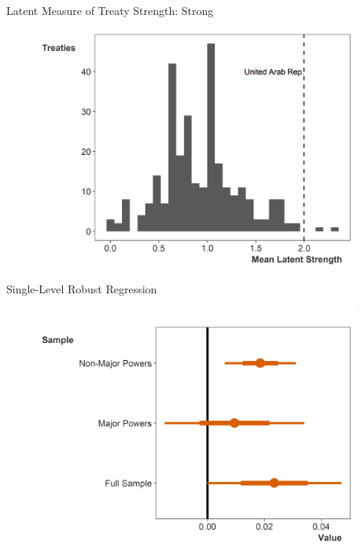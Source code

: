 \documentclass{beamer}
\begin{document}

\begin{frame}{Latent Measure of Treaty Strength: Strong}

\begin{figure}[htbp]
	\centering
		\includegraphics[width=0.95\textwidth]{ls-hist-strong.png}
\end{figure}


\end{frame} 



\begin{frame}{Single-Level Robust Regression}

\begin{figure}[htbp]
	\centering
		\includegraphics[width=0.95\textwidth]{robust-reg-coef.png}
	\label{fig:robust-reg-coef}
\end{figure}



\end{frame}



\end{document}
